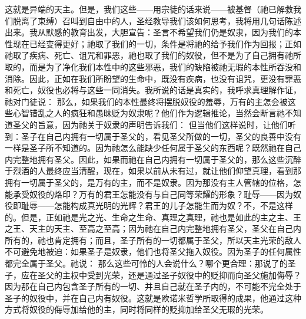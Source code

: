 这就是异端的天主。但是，我们这些——用宗徒的话来说——被基督（祂已解救我们脱离了束缚）召叫到自由中的人，圣经教导我们该如何思考，我将用几句话陈述出来。我从默感的教育出发，大胆宣告：圣言不希望我们仍是奴隶，因为我们的本性现在已经变得更好；祂取了我们的一切，条件是将祂的给予我们作为回报；正如祂取了疾病、死亡、诅咒和罪恶，祂也取了我们的奴役，但不是为了自己拥有祂所取的，而是为了净化我们本性中的这些邪恶，我们的缺陷被祂无瑕的本性所吞没和消除。因此，正如在我们所盼望的生命中，既没有疾病，也没有诅咒，更没有罪恶和死亡，奴役也必将与这些一同消失。我所说的话是真实的，我呼求真理解作证，祂对门徒说： 那么，如果我们的本性最终将摆脱奴役的羞辱，万有的主怎会被这些心智错乱之人的疯狂和愚昧贬为奴隶呢？他们作为逻辑推论，当然会断言祂不知道圣父的旨意，因为祂关于奴隶的声明告诉我们： 但当他们这样说时，让他们听到：圣子在自己内拥有一切属于圣父的，看见圣父所做的一切，圣父的良善中没有一样是圣子所不知道的。因为祂怎么能缺少任何属于圣父的东西呢？既然祂在自己内完整地拥有圣父。因此，如果而祂在自己内拥有一切属于圣父的，那么这些沉醉于烈酒的人最终应当清醒，现在，如果以前从未有过，就让他们仰望真理，看到那拥有一切属于圣父的，是万有的主，而不是奴隶。因为那没有主人管辖的位格，怎能承受奴役的烙印？万有的君王怎能没有与自己同等荣耀的形象？耻辱——因为奴役即耻辱——怎能构成真光明的光辉？君王的儿子怎能生而为奴？不，不是这样的。但是，正如祂是光之光、生命之生命、真理之真理，祂也是如此的主之主、王之王、天主的天主、至高之至高；因为祂在自己内完整地拥有圣父，圣父在自己内所有的，祂也肯定拥有；而且，圣子所有的一切都属于圣父，所以天主光荣的敌人不可避免地被迫：如果圣子是奴隶，他们也将圣父拖入奴役。因为圣子的任何属性都完全属于圣父。祂说： 那么这些可怜的人会说什么？哪个更合理：那说了的圣子，应在圣父的主权中受到光荣，还是通过圣子奴役中的贬抑而向圣父施加侮辱？因为那在自己内包含圣子所有的一切、并且自己就在圣子内的，不可能不完全处于圣子的奴役中，并在自己内有奴役。这就是欧诺米哲学所取得的成果，他通过这种方式将奴役的侮辱加给他的主，同时将同样的贬抑加给圣父无瑕的光荣。\par

